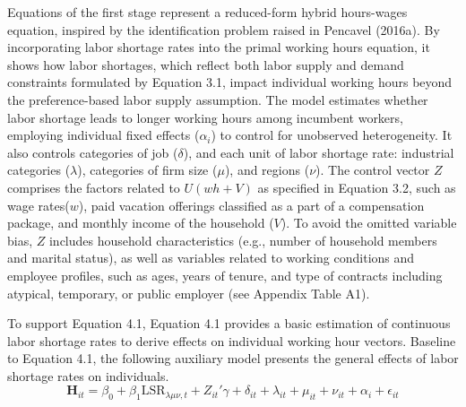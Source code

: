 \documentclass[
  12pt,
]{article}
\begin{document}
Equations of the first stage represent a reduced-form hybrid hours-wages
equation, inspired by the identification problem raised in Pencavel
(2016a). By incorporating labor shortage rates into the primal working
hours equation, it shows how labor shortages, which reflect both labor
supply and demand constraints formulated by Equation 3.1, impact
individual working hours beyond the preference-based labor supply
assumption. The model estimates whether labor shortage leads to longer
working hours among incumbent workers, employing individual fixed
effects (\(\alpha_i\)) to control for unobserved heterogeneity. It also
controls categories of job (\(\delta\)), and each unit of labor shortage
rate: industrial categories (\(\lambda\)), categories of firm size
(\(\mu\)), and regions (\(\nu\)). The control vector \(Z\) comprises the
factors related to \(U(wh+V)\) as specified in Equation 3.2, such as
wage rates(\(w\)), paid vacation offerings classified as a part of a
compensation package, and monthly income of the household (\(V\)). To
avoid the omitted variable bias, \(Z\) includes household
characteristics (e.g., number of household members and marital status),
as well as variables related to working conditions and employee
profiles, such as ages, years of tenure, and type of contracts including
atypical, temporary, or public employer (see Appendix Table A1).

To support Equation 4.1, Equation 4.1 provides a basic estimation of
continuous labor shortage rates to derive effects on individual working
hour vectors. Baseline to Equation 4.1, the following auxiliary model
presents the general effects of labor shortage rates on individuals. \[
\mathbf{H}_{it}=\beta_0 + \beta_1 \text{LSR}_{\lambda\mu\nu,t} + Z_{it}' \gamma + \delta_{it} + \lambda_{it} + \mu_{it} + \nu_{it} +\alpha_i + \epsilon_{it}
\tag{4.1}
\]
\end{document}
